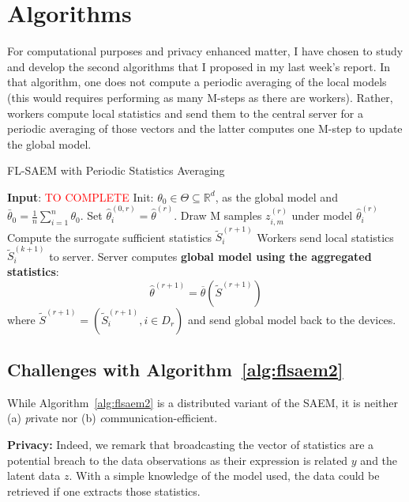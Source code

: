 \documentclass[11pt]{article}
\theoremstyle{t}
\begin{document}
\clearpage
\section{Algorithms}

For computational purposes and privacy enhanced matter, I have chosen to study and develop the second algorithms that I proposed in my last week's report.
In that algorithm, one does not compute a periodic averaging of the local models (this would requires performing as many M-steps as there are workers).
Rather, workers compute local statistics and send them to the central server for a periodic averaging of those vectors and the latter computes one M-step to update the global model.

\begin{algorithm}[H]
\caption{FL-SAEM with Periodic Statistics Averaging} \label{alg:flsaem2}
\begin{algorithmic}[1]
\STATE \textbf{Input}: \textcolor{red}{TO COMPLETE}
\STATE Init: $\theta_{0} \in \Theta \subseteq \mathbb R^d $, as the global model and $\bar{\theta}_0 =  \frac{1}{n} \sum_{i=1}^n \theta_0$.
\STATE Set $\hat{\theta}^{(0,r)}_i = \hat{\theta}^{(r)}$.
\STATE Draw M samples $z_{i,m}^{(r)}$ under model $\hat{\theta}^{(r)}_i$ \label{line:sampling}
\STATE Compute the surrogate sufficient statistics $\tilde{S}_{i}^{(r+1)}$ \label{line:compute}
\STATE Workers send local statistics $\tilde{S}_{i}^{(k+1)}$ to server.
\ENDFOR
\STATE Server computes \textbf{global model using the aggregated statistics}:
$$
\hat{\theta}^{(r+1)} = \overline{\theta}( \tilde{S}^{(r+1)}) 
$$
where $\tilde{S}^{(r+1)} = (\tilde{S}_i^{(r+1)}, i \in D_r)$  and send global model back to the devices. 
\ENDFOR
\end{algorithmic}
\end{algorithm}


\subsection{Challenges with Algorithm~\ref{alg:flsaem2}}
While Algorithm~\ref{alg:flsaem2} is a distributed variant of the SAEM, it is neither (a) \emph private nor (b) \emph communication-efficient.

\textbf{Privacy:} Indeed, we remark that broadcasting the vector of statistics are a potential breach to the data observations as their expression is related $y$ and the latent data $z$. With a simple knowledge of the model used, the data could be retrieved if one extracts those statistics.
\end{document}
